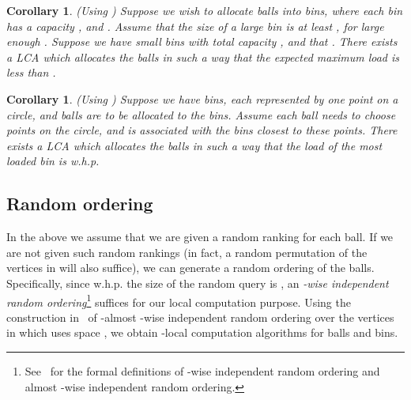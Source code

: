 \documentclass[english, oribibl]{llncs}
\newtheorem{corollary}[theorem]{Corollary}
\begin{document}
\begin{corollary} (Using  \cite{BBFN10}) 
Suppose we wish to allocate  balls into  bins, where each bin  has a capacity , and . Assume that the size of a large bin is at least , for large enough . Suppose we have  small bins with total capacity , and that . There exists a   LCA which allocates the balls in such a way that the expected maximum load is less than .
\end{corollary}

\begin{corollary} (Using  \cite{BCM03}) 
Suppose we have  bins, each represented by one point on a circle, and  balls are to be allocated to the bins. Assume each ball needs to choose  points on the circle, and is associated with the bins closest to these points. There exists a   LCA which allocates the balls in such a way that the load of the most loaded bin is  w.h.p.
\end{corollary}


\subsection{Random ordering}
In the above we assume that we are given a random ranking for each ball.
If we are not given such random rankings
(in fact, a random permutation of the vertices in  will also suffice),
we can generate a random ordering of the balls.
Specifically, since w.h.p. the size of the random query is ,
 an \emph{-wise independent random ordering}\footnote{
 See~\cite{ARV+11} for
the formal definitions of -wise independent random ordering and almost -wise independent random ordering.}
suffices for our local computation purpose.
Using the construction in~\cite{ARV+11} of
-almost -wise independent random ordering over the vertices in 
which uses space , we obtain
  -local
computation algorithms for balls and bins.









\newpage



\newpage

\appendix


\newcommand{\polylog}[1]{\mathrm{polylog}(#1)}
\newcommand{\ttwo}{\log n}
\end{document}
